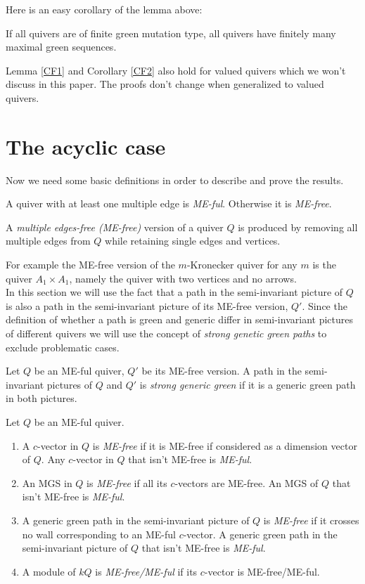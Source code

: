 \indent Here is an easy corollary of the lemma above:\\
\begin{corollary}\label{CF2}
If all quivers are of finite green mutation type, all quivers have finitely many maximal green sequences.\\
\end{corollary}
\indent Lemma \ref{CF1} and Corollary \ref{CF2} also hold for valued quivers which we won't discuss in this paper. The proofs don't change when generalized to valued quivers.\\ 
\section{The acyclic case}
\indent Now we need some basic definitions in order to describe and prove the results.
\begin{definition}
A quiver with at least one multiple edge is \textit{ME-ful}. Otherwise it is \textit{ME-free}.
\end{definition}
\begin{definition}
A \textit{multiple edges-free (ME-free)} version of a quiver $Q$ is produced by removing all multiple edges from $Q$ while retaining single edges and vertices.
\end{definition}
\indent For example the ME-free version of the $m$-Kronecker quiver for any $m$ is the quiver $A_1\times A_1$, namely the quiver with two vertices and no arrows.\\
\indent In this section we will use the fact that a path in the semi-invariant picture of $Q$ is also a path in the semi-invariant picture of its ME-free version, $Q'$. Since the definition of whether a path is green and generic differ in semi-invariant pictures of different quivers we will use the concept of \textit{strong genetic green paths} to exclude problematic cases.
\begin{definition}
Let $Q$ be an ME-ful quiver, $Q'$ be its ME-free version. A path in the semi-invariant pictures of $Q$ and $Q'$ is \textit{strong generic green} if it is a generic green path in both pictures.
\end{definition}
\begin{definition}
Let $Q$ be an ME-ful quiver.
\begin{enumerate}
\item A $c$-vector in $Q$ is \textit{ME-free} if it is ME-free if considered as a dimension vector of $Q$. Any $c$-vector in $Q$ that isn't ME-free is \textit{ME-ful}.
\item An MGS in $Q$ is \textit{ME-free} if all its $c$-vectors are ME-free. An MGS of $Q$ that isn't ME-free is \textit{ME-ful}.
\item A generic green path in the semi-invariant picture of $Q$ is \textit{ME-free} if it crosses no wall corresponding to an ME-ful $c$-vector. A generic green path in the semi-invariant picture of $Q$ that isn't ME-free is \textit{ME-ful}.
\item A module of $kQ$ is \textit{ME-free/ME-ful} if its $c$-vector is ME-free/ME-ful.
\end{enumerate}
\end{definition}
